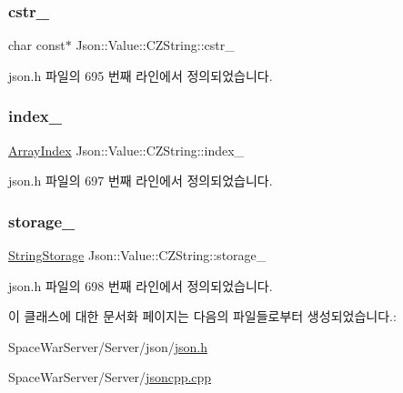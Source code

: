 \mbox{\label{class_json_1_1_value_1_1_c_z_string_a5b4d28349294034d7f779c3c95d0306c}} 
\subsubsection{\texorpdfstring{cstr\+\_\+}{cstr\_}}
{\footnotesize\ttfamily char const$\ast$ Json\+::\+Value\+::\+C\+Z\+String\+::cstr\+\_\+\hspace{0.3cm}{\ttfamily [private]}}



json.\+h 파일의 695 번째 라인에서 정의되었습니다.

\mbox{\label{class_json_1_1_value_1_1_c_z_string_aecf29982235c9c165a0971023ebbb270}} 
\subsubsection{\texorpdfstring{index\+\_\+}{index\_}}
{\footnotesize\ttfamily \hyperlink{class_json_1_1_value_a184a91566cccca7b819240f0d5561c7d}{Array\+Index} Json\+::\+Value\+::\+C\+Z\+String\+::index\+\_\+}



json.\+h 파일의 697 번째 라인에서 정의되었습니다.

\mbox{\label{class_json_1_1_value_1_1_c_z_string_a17c92f0f089a4314e3b1d5695dc1a851}} 
\subsubsection{\texorpdfstring{storage\+\_\+}{storage\_}}
{\footnotesize\ttfamily \hyperlink{struct_json_1_1_value_1_1_c_z_string_1_1_string_storage}{String\+Storage} Json\+::\+Value\+::\+C\+Z\+String\+::storage\+\_\+}



json.\+h 파일의 698 번째 라인에서 정의되었습니다.



이 클래스에 대한 문서화 페이지는 다음의 파일들로부터 생성되었습니다.\+:\begin{DoxyCompactItemize}
\item 
Space\+War\+Server/\+Server/json/\hyperlink{json_8h}{json.\+h}\item 
Space\+War\+Server/\+Server/\hyperlink{jsoncpp_8cpp}{jsoncpp.\+cpp}\end{DoxyCompactItemize}

